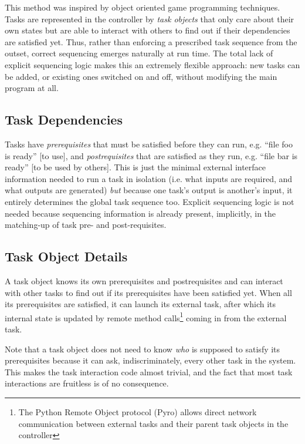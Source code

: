 \documentclass[a4paper,12pt]{amsart}
\begin{document}
This method was inspired by object oriented game programming techniques.
Tasks are represented in the controller by {\em task objects} that only
care about their own states but are able to interact with others to find
out if their dependencies are satisfied yet. Thus, rather than enforcing
a prescribed task sequence from the outset, correct sequencing emerges
naturally at run time.  The total lack of explicit sequencing logic
makes this an extremely flexible approach: new tasks can be added, or
existing ones switched on and off, without modifying the main program at
all.


\subsection{Task Dependencies}

Tasks have {\em prerequisites} that must be satisfied before they can
run, e.g. ``file foo is ready'' [to use], and {\em postrequisites} that
are satisfied as they run, e.g. ``file bar is ready'' [to be used by
others]. This is just the minimal external interface information needed
to run a task in isolation (i.e. what inputs are required, and what
outputs are generated) {\em but} because one task's output is another's
input, it entirely determines the global task sequence too. Explicit
sequencing logic is not needed because sequencing information is already
present, implicitly, in the matching-up of task pre- and
post-requisites. 

\subsection{Task Object Details}

A task object knows its own prerequisites and postrequisites and can
interact with other tasks to find out if its prerequisites have been
satisfied yet. When all its prerequisites are satisfied, it can launch
its external task, after which its internal state is updated by remote
method calls\footnote{The Python Remote Object protocol (Pyro) allows
direct network communication between external tasks and their parent
task objects in the controller} coming in from the external task. 

Note that a task object does not need to know {\em who} is supposed to
satisfy its prerequisites because it can ask, indiscriminately, every
other task in the system. This makes the task interaction code almost
trivial, and the fact that most task interactions are fruitless is of no
consequence. 
\end{document}
